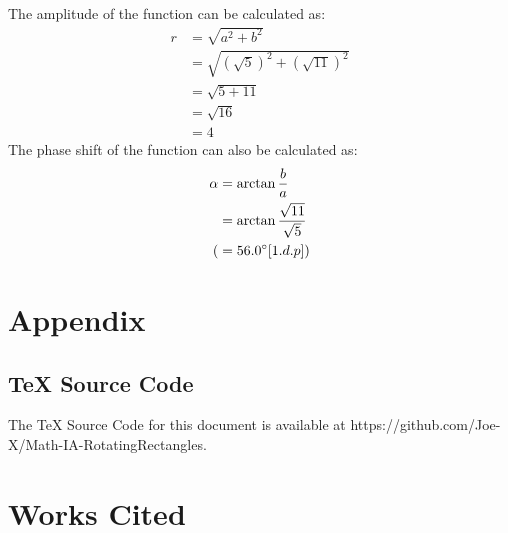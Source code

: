 \documentclass{article}
\begin{document}
        The amplitude of the function can be calculated as:
        \begin{align*}
        r &= \sqrt{a^2 + b^2} \\
        &= \sqrt{(\sqrt{5})^2 + (\sqrt{11})^2} \\
        &= \sqrt{5 + 11} \\
        &= \sqrt{16} \\
        &= 4
        \end{align*}
        The phase shift of the function can also be calculated as:
        \begin{align*}
        \alpha &= \arctan{\frac{b}{a}} \\
        &= \arctan{\frac{\sqrt{11}}{\sqrt{5}}} \\
        (&= 56.0\degree [1.d.p]) 
        \end{align*}
        
        \newpage
        \section{Appendix}
        \subsection{TeX Source Code} The TeX Source Code for this document is available at https://github.com/Joe-X/Math-IA-RotatingRectangles.
        
        \newpage
        \section{Works Cited}
        \printbibliography
    \newpage
    
\end{document}
